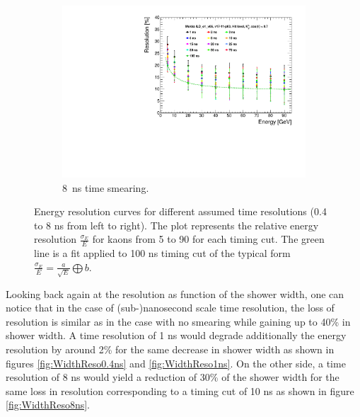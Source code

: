 \begin{figure}[htbp!]
\begin{subfigure}[t]{0.48\textwidth}
    \centering
    \includegraphics[width=1\linewidth]{../Thesis_Plots/ILD/Smearing_8ns/Plots/ShowerResoAbsolute_TimeCuts_Smearing3}
    \caption{\SI{8}{\nano\second} time smearing.}  \label{fig:Reso8ns}
  \end{subfigure}
  \caption{Energy resolution curves for different assumed time resolutions (0.4 to 8 ns from left to right). The plot represents the relative energy resolution $\frac{\sigma_{E}}{E}$ for kaons from 5 to 90 \GeV for each timing cut. The green line is a fit applied to 100 ns timing cut of the typical form $\frac{\sigma_{E}}{E} = \frac{a}{\sqrt{E}} \bigoplus b$.}
\end{figure}

Looking back again at the resolution as function of the shower width, one can notice that in the case of (sub-)nanosecond scale time resolution, the loss of resolution is similar as in the case with no smearing while gaining up to 40\% in shower width. A time resolution of 1 ns would degrade additionally the energy resolution by around 2\% for the same decrease in shower width as shown in figures \ref{fig:WidthReso0.4ns} and \ref{fig:WidthReso1ns}. On the other side, a time resolution of 8 ns would yield a reduction of 30\% of the shower width for the same loss in resolution corresponding to a timing cut of 10 ns as shown in figure \ref{fig:WidthReso8ns}.\\

